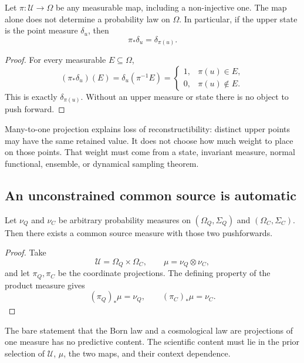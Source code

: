 \documentclass[11pt]{article}
\newcommand{\U}{\mathcal{U}}
\begin{document}
\begin{proposition}
Let \(\pi:\U\to\Omega\) be any measurable map, including a non-injective one.
The map alone does not determine a probability law on \(\Omega\). In
particular, if the upper state is the point measure \(\delta_u\), then
\[
\pi_{\!*}\delta_u=\delta_{\pi(u)}.
\]
\end{proposition}

\begin{proof}
For every measurable \(E\subseteq\Omega\),
\[
(\pi_{\!*}\delta_u)(E)
=\delta_u(\pi^{-1}E)
=
\begin{cases}
1,&\pi(u)\in E,\\
0,&\pi(u)\notin E.
\end{cases}
\]
This is exactly \(\delta_{\pi(u)}\). Without an upper measure or state there is
no object to push forward.
\end{proof}

Many-to-one projection explains loss of reconstructibility: distinct upper
points may have the same retained value. It does not choose how much weight to
place on those points. That weight must come from a state, invariant measure,
normal functional, ensemble, or dynamical sampling theorem.

\subsection{An unconstrained common source is automatic}

\begin{proposition}
Let \(\nu_Q\) and \(\nu_C\) be arbitrary probability measures on
\((\Omega_Q,\Sigma_Q)\) and \((\Omega_C,\Sigma_C)\). Then there exists a common
source measure with those two pushforwards.
\end{proposition}

\begin{proof}
Take
\[
\U=\Omega_Q\times\Omega_C,\qquad
\mu=\nu_Q\otimes\nu_C,
\]
and let \(\pi_Q,\pi_C\) be the coordinate projections. The defining property of
the product measure gives
\[
(\pi_Q)_{\!*}\mu=\nu_Q,\qquad
(\pi_C)_{\!*}\mu=\nu_C.
\]
\end{proof}

\begin{corollary}
The bare statement that the Born law and a cosmological law are projections of
one measure has no predictive content. The scientific content must lie in the
prior selection of \(\U\), \(\mu\), the two maps, and their context dependence.
\end{corollary}
\end{document}
